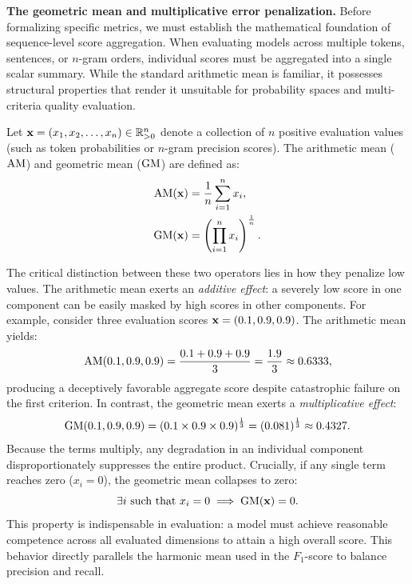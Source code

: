 \documentclass[../../main.tex]{subfiles}
\begin{document}
\noindent\textbf{The geometric mean and multiplicative error penalization.}\newline
Before formalizing specific metrics, we must establish the mathematical foundation of sequence-level score aggregation. When evaluating models across multiple tokens, sentences, or $n$-gram orders, individual scores must be aggregated into a single scalar summary. While the standard arithmetic mean is familiar, it possesses structural properties that render it unsuitable for probability spaces and multi-criteria quality evaluation.

Let $\mathbf{x} = (x_1, x_2, \dots, x_n) \in \mathbb{R}_{>0}^n$ denote a collection of $n$ positive evaluation values (such as token probabilities or $n$-gram precision scores). The arithmetic mean ($\mathrm{AM}$) and geometric mean ($\mathrm{GM}$) are defined as:
\begin{align}
\label{eq:arithmetic_mean_def}
\mathrm{AM}(\mathbf{x}) &= \frac{1}{n} \sum_{i=1}^n x_i, \\
\label{eq:geometric_mean_def}
\mathrm{GM}(\mathbf{x}) &= \left( \prod_{i=1}^n x_i \right)^{\frac{1}{n}}.
\end{align}

The critical distinction between these two operators lies in how they penalize low values. The arithmetic mean exerts an \textit{additive effect}: a severely low score in one component can be easily masked by high scores in other components. For example, consider three evaluation scores $\mathbf{x} = (0.1, 0.9, 0.9)$. The arithmetic mean yields:
\begin{equation}
\mathrm{AM}(0.1, 0.9, 0.9) = \frac{0.1 + 0.9 + 0.9}{3} = \frac{1.9}{3} \approx 0.6333,
\end{equation}
producing a deceptively favorable aggregate score despite catastrophic failure on the first criterion. In contrast, the geometric mean exerts a \textit{multiplicative effect}:
\begin{equation}
\mathrm{GM}(0.1, 0.9, 0.9) = (0.1 \times 0.9 \times 0.9)^{\frac{1}{3}} = (0.081)^{\frac{1}{3}} \approx 0.4327.
\end{equation}
Because the terms multiply, any degradation in an individual component disproportionately suppresses the entire product. Crucially, if any single term reaches zero ($x_i = 0$), the geometric mean collapses to zero:
\begin{equation}
\label{eq:geometric_mean_zero_collapse}
\exists i \text{ such that } x_i = 0 \implies \mathrm{GM}(\mathbf{x}) = 0.
\end{equation}
This property is indispensable in evaluation: a model must achieve reasonable competence across all evaluated dimensions to attain a high overall score. This behavior directly parallels the harmonic mean used in the $F_1$-score to balance precision and recall.
\end{document}
